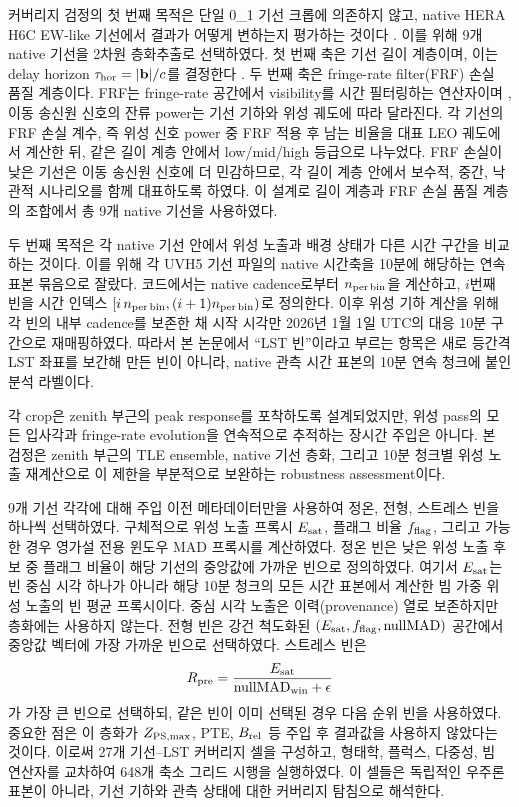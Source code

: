\documentclass[final,5p,times]{elsarticle}
\newcommand{\NCoverageRows}{648}
\begin{document}
커버리지 검정의 첫 번째 목적은 단일 0\_1 기선 크롭에 의존하지 않고, native HERA H6C EW-like
기선에서 결과가 어떻게 변하는지 평가하는 것이다 \citep{deboer2017,abdurashidova2022}. 이를 위해
9개 native 기선을 2차원 층화추출로
선택하였다. 첫 번째 축은 기선 길이 계층이며, 이는 delay horizon
$\tau_{\rm hor}=|\mathbf{b}|/c$를 결정한다 \citep{parsons2012delay,liu2014wedge}. 두 번째 축은
fringe-rate filter(FRF) 손실 품질 계층이다. FRF는 fringe-rate 공간에서 visibility를 시간
필터링하는 연산자이며 \citep{parsons2015frf,garsden2024frf}, 이동 송신원 신호의 잔류 power는 기선
기하와 위성 궤도에 따라 달라진다. 각 기선의 FRF 손실 계수, 즉 위성 신호 power 중 FRF 적용 후
남는 비율을 대표 LEO 궤도에서 계산한 뒤, 같은 길이 계층 안에서 low/mid/high 등급으로 나누었다.
FRF 손실이 낮은 기선은 이동 송신원 신호에 더 민감하므로, 각 길이 계층 안에서 보수적, 중간,
낙관적 시나리오를 함께 대표하도록 하였다. 이 설계로 길이 계층과 FRF 손실 품질 계층의 조합에서
총 9개 native 기선을 사용하였다.

두 번째 목적은 각 native 기선 안에서 위성 노출과 배경 상태가 다른 시간 구간을 비교하는 것이다.
이를 위해 각 UVH5 기선 파일의 native 시간축을 10분에 해당하는
연속 표본 묶음으로 잘랐다. 코드에서는 native cadence로부터 $n_{\rm per\,bin}$을 계산하고,
$i$번째 빈을 시간 인덱스 $[i\,n_{\rm per\,bin},(i+1)n_{\rm per\,bin})$로 정의한다. 이후 위성 기하
계산을 위해 각 빈의 내부 cadence를 보존한 채 시작 시각만 2026년 1월 1일 UTC의 대응 10분
구간으로 재매핑하였다. 따라서 본 논문에서 ``LST 빈''이라고 부르는 항목은 새로 등간격 LST 좌표를
보간해 만든 빈이 아니라, native 관측 시간 표본의 10분 연속 청크에 붙인 분석 라벨이다.

각 crop은 zenith 부근의 peak response를 포착하도록 설계되었지만, 위성 pass의 모든 입사각과
fringe-rate evolution을 연속적으로 추적하는 장시간 주입은 아니다. 본 검정은 zenith 부근의 TLE
ensemble, native 기선 층화, 그리고 10분 청크별 위성 노출 재계산으로 이 제한을 부분적으로 보완하는
robustness assessment이다.

9개 기선 각각에 대해 주입 이전 메타데이터만을 사용하여 정온, 전형, 스트레스 빈을 하나씩 선택하였다.
구체적으로 위성 노출 프록시 $E_{\rm sat}$, 플래그 비율 $f_{\rm flag}$, 그리고 가능한 경우 영가설 전용
윈도우 MAD 프록시를 계산하였다. 정온 빈은 낮은 위성 노출 후보 중 플래그 비율이 해당 기선의
중앙값에 가까운 빈으로 정의하였다. 여기서 $E_{\rm sat}$는 빈 중심 시각 하나가 아니라 해당 10분 청크의
모든 시간 표본에서 계산한 빔 가중 위성 노출의 빈 평균 프록시이다. 중심 시각 노출은 이력(provenance)
열로 보존하지만 층화에는 사용하지 않는다. 전형 빈은 강건 척도화된 $(E_{\rm sat}, f_{\rm flag}, {\rm nullMAD})$
공간에서 중앙값 벡터에 가장 가까운 빈으로 선택하였다. 스트레스 빈은
\begin{equation}
  R_{\rm pre}=\frac{E_{\rm sat}}{{\rm nullMAD}_{\rm win}+\epsilon}
\end{equation}
가 가장 큰 빈으로 선택하되, 같은 빈이 이미 선택된 경우 다음 순위 빈을 사용하였다. 중요한 점은 이 층화가
$Z_{\rm PS,max}$, PTE, $B_{\rm rel}$ 등 주입 후 결과값을 사용하지 않았다는 것이다.
이로써 27개 기선--LST 커버리지 셀을 구성하고, 형태학, 플럭스, 다중성, 빔 연산자를
교차하여 \NCoverageRows{}개 축소 그리드 시행을 실행하였다. 이 셀들은 독립적인 우주론 표본이 아니라,
기선 기하와 관측 상태에 대한 커버리지 탐침으로 해석한다.
\end{document}
